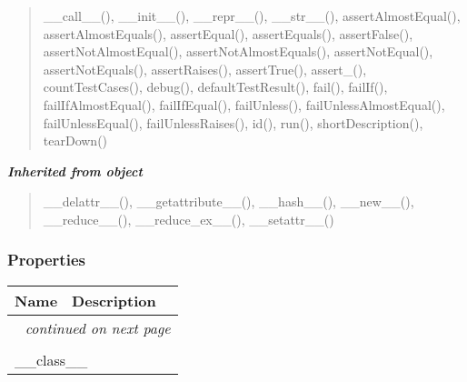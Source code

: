 \begin{quote}
\_\_call\_\_(), \_\_init\_\_(), \_\_repr\_\_(), \_\_str\_\_(), assertAlmostEqual(), assertAlmostEquals(), assertEqual(), assertEquals(), assertFalse(), assertNotAlmostEqual(), assertNotAlmostEquals(), assertNotEqual(), assertNotEquals(), assertRaises(), assertTrue(), assert\_(), countTestCases(), debug(), defaultTestResult(), fail(), failIf(), failIfAlmostEqual(), failIfEqual(), failUnless(), failUnlessAlmostEqual(), failUnlessEqual(), failUnlessRaises(), id(), run(), shortDescription(), tearDown()
\end{quote}

\large{\textbf{\textit{Inherited from object}}}

\begin{quote}
\_\_delattr\_\_(), \_\_getattribute\_\_(), \_\_hash\_\_(), \_\_new\_\_(), \_\_reduce\_\_(), \_\_reduce\_ex\_\_(), \_\_setattr\_\_()
\end{quote}


  \subsubsection{Properties}

    \vspace{-1cm}
\hspace{\varindent}\begin{longtable}{|p{\varnamewidth}|p{\vardescrwidth}|l}
\cline{1-2}
\cline{1-2} \centering \textbf{Name} & \centering \textbf{Description}& \\
\cline{1-2}
\endhead\cline{1-2}\multicolumn{3}{r}{\small\textit{continued on next page}}\\\endfoot\cline{1-2}
\endlastfoot\multicolumn{2}{|l|}{\textit{Inherited from object}}\\
\multicolumn{2}{|p{\varwidth}|}{\raggedright \_\_class\_\_}\\
\cline{1-2}
\end{longtable}

